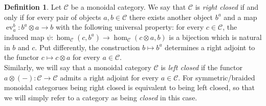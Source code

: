 \documentclass{article}
\newcommand{\ev}{\operatorname{ev}}%
\newcommand{\C}{\mathcal{C}}
\numberwithin{equation}{section}
\theoremstyle{definition}
\newtheorem{definition}{Definition}[subsection]
\theoremstyle{theorem}
\begin{document}
\begin{definition}\label{Definition: right closed monoidal category}
    Let $\C$ be a monoidal category. We say that $\C$ is \emph{right closed} if and only if for every pair of objects $a,b \in \C$ there exists another object 
    $b^a$ and a map $\ev_a^b \colon b^a \otimes a \to b$ with the following universal property: for every $c \in \C$, the induced map 
    $\psi \colon \hom_{\C}(c,b^a) \to \hom_{\C}(c \otimes a,b)$ is a bijection which is natural in $b$ and $c$. Put differently, the construction $b \mapsto b^a$ 
    determines a right adjoint to the functor $c \mapsto c \otimes a$ for every $a \in \C$.\\
    Similarly, we will say that a monoidal category $\C$ is \emph{left closed} if the functor $a \otimes (-) \colon \C \to \C$ 
    admits a right adjoint for every $a \in \C$. For symmetric/braided monoidal categorues being right closed is equivalent to being left closed, so that we will 
    simply refer to a category as being \emph{closed} in this case.
\end{definition}
\end{document}
